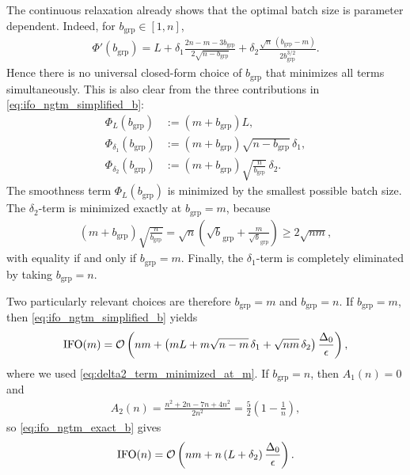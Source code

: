 \documentclass{article}
\newcommand{\cO}{{\cal O}}
\newcommand{\eqdef}{:=}
\newcommand{\rb}[1]{\left(#1\right)}
\theoremstyle{plain}
\begin{document}
The continuous relaxation already shows that the optimal batch size is parameter dependent. Indeed, for $b_{\mathrm{grp}}\in[1,n]$,
\begin{align*}
\Phi'(b_{\mathrm{grp}})
=
L
+\delta_1\frac{2n-m-3b_{\mathrm{grp}}}{2\sqrt{n-b_{\mathrm{grp}}}}
+\delta_2\frac{\sqrt n\,(b_{\mathrm{grp}}-m)}{2b_{\mathrm{grp}}^{3/2}}.
\end{align*}
Hence there is no universal closed-form choice of $b_{\mathrm{grp}}$ that minimizes all terms simultaneously. This is also clear from the three contributions in \eqref{eq:ifo_ngtm_simplified_b}:
\begin{align*}
\Phi_L(b_{\mathrm{grp}}) &\eqdef (m+b_{\mathrm{grp}})L,\\
\Phi_{\delta_1}(b_{\mathrm{grp}}) &\eqdef (m+b_{\mathrm{grp}})\sqrt{n-b_{\mathrm{grp}}}\,\delta_1,\\
\Phi_{\delta_2}(b_{\mathrm{grp}}) &\eqdef (m+b_{\mathrm{grp}})\sqrt{\frac{n}{b_{\mathrm{grp}}}}\,\delta_2.
\end{align*}
The smoothness term $\Phi_L(b_{\mathrm{grp}})$ is minimized by the smallest possible batch size. The $\delta_2$-term is minimized exactly at $b_{\mathrm{grp}}=m$, because
\begin{align}
\label{eq:delta2_term_minimized_at_m}
(m+b_{\mathrm{grp}})\sqrt{\frac{n}{b_{\mathrm{grp}}}}
=
\sqrt n\left(\sqrt b_{\mathrm{grp}}+\frac{m}{\sqrt b_{\mathrm{grp}}}\right)
\geq 2\sqrt{nm},
\end{align}
with equality if and only if $b_{\mathrm{grp}}=m$. Finally, the $\delta_1$-term is completely eliminated by taking $b_{\mathrm{grp}}=n$.

Two particularly relevant choices are therefore $b_{\mathrm{grp}}=m$ and $b_{\mathrm{grp}}=n$. If $b_{\mathrm{grp}}=m$, then \eqref{eq:ifo_ngtm_simplified_b} yields
\begin{align}
\label{eq:ifo_ngtm_b_eq_m}
\mathrm{IFO}(m)
=
\cO\rb{
nm +
\rb{
mL + m\sqrt{n-m}\,\delta_1 + \sqrt{nm}\,\delta_2
}\frac{\Delta_0}{\epsilon}
},
\end{align}
where we used \eqref{eq:delta2_term_minimized_at_m}. If $b_{\mathrm{grp}}=n$, then $A_1(n)=0$ and
\begin{align*}
A_2(n)=\frac{n^2+2n-7n+4n^2}{2n^2}
=\frac{5}{2}\left(1-\frac{1}{n}\right),
\end{align*}
so \eqref{eq:ifo_ngtm_exact_b} gives
\begin{align}
\label{eq:ifo_ngtm_b_eq_n}
\mathrm{IFO}(n)
=
\cO\rb{
nm +
n\rb{L+\delta_2}\frac{\Delta_0}{\epsilon}
}.
\end{align}
\end{document}
